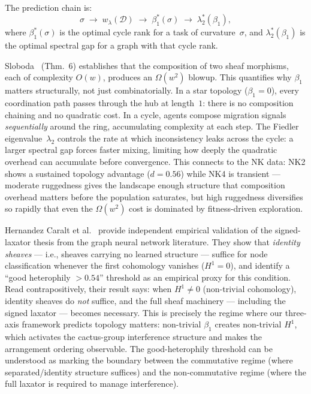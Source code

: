 \noindent
The prediction chain is:
\[
  \sigma \;\longrightarrow\;
  w_\lambda(\mathcal{D})
  \;\longrightarrow\;
  \beta_1^*(\sigma)
  \;\longrightarrow\;
  \lambda_2^*(\beta_1),
\]
where $\beta_1^*(\sigma)$ is the optimal cycle rank for a task of
curvature~$\sigma$, and $\lambda_2^*(\beta_1)$ is the optimal
spectral gap for a graph with that cycle rank.

\begin{remark}
\label{rem:composition-complexity}
Sloboda~\cite{sloboda2026composition} (Thm.~6) establishes that the
composition of two sheaf morphisms, each of complexity $O(w)$,
produces an $\Omega(w^2)$ blowup.  This quantifies why $\beta_1$
matters structurally, not just combinatorially.  In a star topology
($\beta_1 = 0$), every coordination path passes through the hub at
length~$1$: there is no composition chaining and no quadratic cost.
In a cycle, agents compose migration signals \emph{sequentially}
around the ring, accumulating complexity at each step.  The
Fiedler eigenvalue~$\lambda_2$ controls the rate at which
inconsistency leaks across the cycle: a larger spectral gap forces
faster mixing, limiting how deeply the quadratic overhead can
accumulate before convergence.  This connects to the NK data:
NK2 shows a sustained topology advantage ($d = 0.56$) while NK4
is transient --- moderate ruggedness gives the landscape enough
structure that composition overhead matters before the population
saturates, but high ruggedness diversifies so rapidly that even
the $\Omega(w^2)$ cost is dominated by fitness-driven exploration.
\end{remark}

\begin{remark}
\label{rem:identity-sheaves}
Hernandez Caralt et al.~\cite{hernandez2026identity} provide independent
empirical validation of the signed-laxator thesis from the graph neural
network literature.  They show that \emph{identity sheaves} --- i.e.,
sheaves carrying no learned structure --- suffice for node classification
whenever the first cohomology vanishes ($H^1 = 0$), and identify a
``good heterophily $> 0.54$'' threshold as an empirical proxy for this
condition.  Read contrapositively, their result says: when $H^1 \neq 0$
(non-trivial cohomology), identity sheaves do \emph{not} suffice, and
the full sheaf machinery --- including the signed laxator --- becomes
necessary.  This is precisely the regime where our three-axis framework
predicts topology matters: non-trivial $\beta_1$ creates non-trivial
$H^1$, which activates the cactus-group interference structure and makes
the arrangement ordering observable.  The good-heterophily threshold can
be understood as marking the boundary between the commutative regime
(where separated/identity structure suffices) and the non-commutative
regime (where the full laxator is required to manage interference).
\end{remark}

